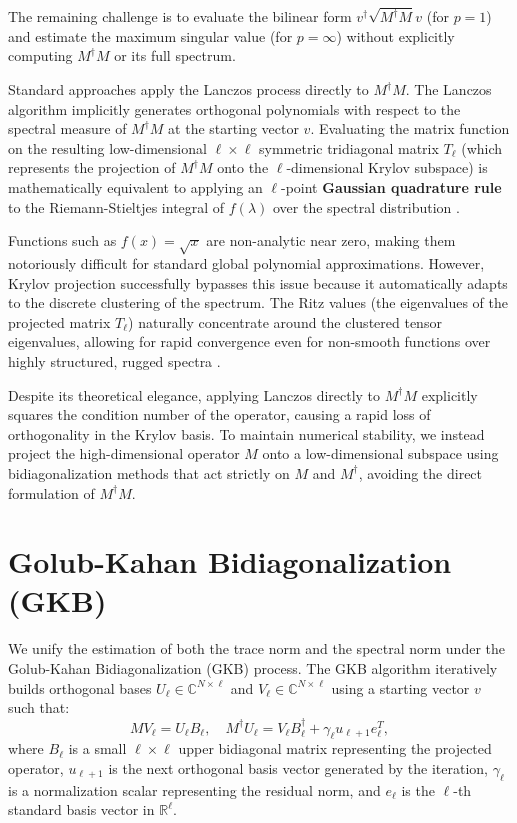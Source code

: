 \documentclass[a4paper,11pt]{article}
\begin{document}
The remaining challenge is to evaluate the bilinear form $v^\dagger \sqrt{M^\dagger M} v$ (for $p=1$) and estimate the maximum singular value (for $p=\infty$) without explicitly computing $M^\dagger M$ or its full spectrum.

Standard approaches apply the Lanczos process directly to $M^\dagger M$. The Lanczos algorithm implicitly generates orthogonal polynomials with respect to the spectral measure of $M^\dagger M$ at the starting vector $v$. Evaluating the matrix function on the resulting low-dimensional $\ell \times \ell$ symmetric tridiagonal matrix $T_\ell$ (which represents the projection of $M^\dagger M$ onto the $\ell$-dimensional Krylov subspace) is mathematically equivalent to applying an $\ell$-point \textbf{Gaussian quadrature rule} to the Riemann-Stieltjes integral of $f(\lambda)$ over the spectral distribution \cite{benzi2023computation}.

Functions such as $f(x) = \sqrt{x}$ are non-analytic near zero, making them notoriously difficult for standard global polynomial approximations. However, Krylov projection successfully bypasses this issue because it automatically adapts to the discrete clustering of the spectrum. The Ritz values (the eigenvalues of the projected matrix $T_\ell$) naturally concentrate around the clustered tensor eigenvalues, allowing for rapid convergence even for non-smooth functions over highly structured, rugged spectra \cite{benzi2026estimation}.

Despite its theoretical elegance, applying Lanczos directly to $M^\dagger M$ explicitly squares the condition number of the operator, causing a rapid loss of orthogonality in the Krylov basis. To maintain numerical stability, we instead project the high-dimensional operator $M$ onto a low-dimensional subspace using bidiagonalization methods that act strictly on $M$ and $M^\dagger$, avoiding the direct formulation of $M^\dagger M$.

\section{Golub-Kahan Bidiagonalization (GKB)}

We unify the estimation of both the trace norm and the spectral norm under the Golub-Kahan Bidiagonalization (GKB) process. The GKB algorithm iteratively builds orthogonal bases $U_\ell \in \mathbb{C}^{N \times \ell}$ and $V_\ell \in \mathbb{C}^{N \times \ell}$ using a starting vector $v$ such that:
\begin{equation}
  M V_\ell = U_\ell B_\ell, \quad M^\dagger U_\ell = V_\ell B_\ell^\dagger + \gamma_\ell u_{\ell+1} e_\ell^T,
\end{equation}
where $B_\ell$ is a small $\ell \times \ell$ upper bidiagonal matrix representing the projected operator, $u_{\ell+1}$ is the next orthogonal basis vector generated by the iteration, $\gamma_\ell$ is a normalization scalar representing the residual norm, and $e_\ell$ is the $\ell$-th standard basis vector in $\mathbb{R}^\ell$.
\end{document}

